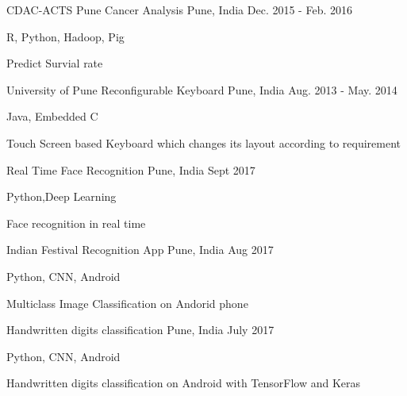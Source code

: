 

\begin{cventries}

  \cventry
    {CDAC-ACTS Pune} %
    {Cancer Analysis} %
    {Pune, India} %
    {Dec. 2015 - Feb. 2016} %
    {
      \begin{cvitems} %
        \item {R, Python, Hadoop, Pig}
        \item {Predict Survial rate}
      \end{cvitems}
    }
  
  \cventry
    {University of Pune} %
    {Reconfigurable Keyboard} %
    {Pune, India} %
    {Aug. 2013 - May. 2014} %
    {
      \begin{cvitems} %
        \item {Java, Embedded C}
        \item {Touch Screen based Keyboard which changes its layout according to requirement}
      \end{cvitems}
    }

  \cventry
    {} %
    {Real Time Face Recognition} %
    {Pune, India} %
    {Sept 2017} %
    {
      \begin{cvitems} %
        \item {Python,Deep Learning}
        \item {Face recognition in real time}
      \end{cvitems}
    }
    \cventry
    {} %
    {Indian Festival Recognition App} %
    {Pune, India} %
    {Aug 2017} %
    {
      \begin{cvitems} %
        \item {Python, CNN, Android}
        \item {Multiclass Image Classification on Andorid phone}
      \end{cvitems}
    }
    \cventry
    {} %
    {Handwritten digits classification} %
    {Pune, India} %
    {July 2017} %
    {
      \begin{cvitems} %
        \item {Python, CNN, Android}
        \item {Handwritten digits classification on Android with TensorFlow and Keras}
      \end{cvitems}
    }



\end{cventries}
